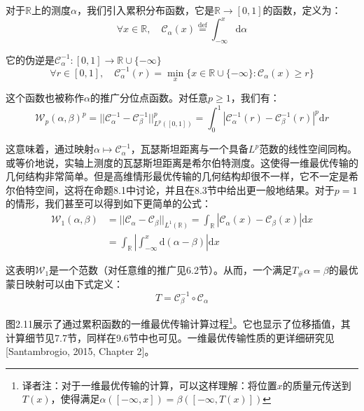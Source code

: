 \documentclass[cn,10pt,math=newtx,citestyle=gb7714-2015,bibstyle=gb7714-2015]{elegantbook}
\begin{document}
\begin{postulate}
对于$\mathbb{R}$上的测度$\alpha$，我们引入累积分布函数，它是$\mathbb{R}\to[0,1]$的函数，定义为：
\begin{equation}
    \label{2.34}
    \forall x\in\mathbb{R},\quad \mathcal{C}_\alpha(x)\overset{\text{def}}{=} \int_{-\infty}^x \text{d}\alpha
\end{equation}

它的伪逆是$\mathcal{C}_\alpha^{-1}:[0,1]\to \mathbb{R}\cup \{-\infty\}$
\begin{equation}
    \label{2.35}
    \forall r\in[0,1], \quad \mathcal{C}_\alpha^{-1}(r)=\min\limits_x\{ x\in\mathbb{R}\cup \{-\infty\}:\mathcal{C}_\alpha(x)\geq r \}
\end{equation}

这个函数也被称作$\alpha$的推广分位点函数。对任意$p\geq 1$，我们有：
\begin{equation}
    \label{2.36}
    \mathcal{W}_p(\alpha,\beta)^p=||\mathcal{C}_\alpha^{-1}-\mathcal{C}_\beta^{-1}||^p_{L^p([0,1])}=\int_0^1 |\mathcal{C}_\alpha^{-1}(r)-\mathcal{C}_\beta^{-1}(r)|^p \text{d}r
\end{equation}

这意味着，通过映射$\alpha\mapsto\mathcal{C}_\alpha^{-1}$，瓦瑟斯坦距离与一个具备$L^p$范数的线性空间同构。或等价地说，实轴上测度的瓦瑟斯坦距离是希尔伯特测度。这使得一维最优传输的几何结构非常简单。但是高维情形最优传输的几何结构却很不一样，它不一定是希尔伯特空间，这将在命题8.1中讨论，并且在8.3节中给出更一般地结果。对于$p=1$的情形，我们甚至可以得到如下更简单的公式：
\begin{align}
    \label{2.37}
    \mathcal{W}_1(\alpha,\beta) &= ||\mathcal{C}_\alpha-\mathcal{C}_\beta||_{L^1(\mathbb{R})}=\int_\mathbb{R}|\mathcal{C}_\alpha(x)-\mathcal{C}_\beta(x)|\text{d}x\\
    \label{2.38}
    &= \int_\mathbb{R}\left| \int_{-\infty}^x\text{d}(\alpha-\beta) \right| \text{d}x
\end{align}

这表明$\mathcal{W}_1$是一个范数（对任意维的推广见6.2节）。从而，一个满足$T_\#\alpha=\beta$的最优蒙日映射可以由下式定义：
\begin{equation}
    \label{2.39}
    T=\mathcal{C}_\beta^{-1}\circ \mathcal{C}_\alpha
\end{equation}

图2.11展示了通过累积函数的一维最优传输计算过程\footnote{译者注：对于一维最优传输的计算，可以这样理解：将位置$x$的质量元传送到$T(x)$，使得满足$\alpha([-\infty, x])=\beta([-\infty, T(x)])$}。它也显示了位移插值，其计算细节见7.7节，同样在9.6节中也可见。一维最优传输性质的更详细研究见[Santambrogio, 2015, Chapter 2]。
\end{postulate}
\end{document}
